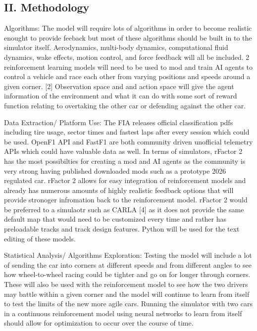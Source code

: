 \documentclass[11pt]{article} %
\begin{document}
\subsection{II. Methodology}

Algorithms: The model will require lots of algorithms in order to become realistic enought to provide feeback but most of these algorithms should be built in to the simulator itself. Aerodynamics, multi-body dynamics, computational fluid dynamics, wake effects, motion control, and force feedback will all be included. 2 reinforcement learning models will need to be used to mod and train AI agents to control a vehicle and race each other from varying positions and speeds around a given corner. [2] Observation space and and action space will give the agent information of the environment and what it can do with some sort of reward function relating to overtaking the other car or defending against the other car.

Data Extraction/ Platform Use: The FIA releases official classification pdfs including tire usage, sector times and fastest laps after every session which could be used. OpenF1 API and FastF1 are both community driven unofficial telemetry APIs which could have valuable data as well. In terms of simulators, rFactor 2 has the most possibilties for creating a mod and AI agents as the community is very strong having published downloaded mods such as a prototype 2026 regulated car. rFactor 2 allows for easy integration of reinforcement models and already has numerous amounts of highly realistic feedback options that will provide stronoger infromation back to the reinforcement model.  rFactor 2 would be preferred to a simulaotr such as CARLA [4] as it does not provide the same default map that would need to be customized every time and rather has preloadable tracks and track design features. Python will be used for the text editing of these models.

Statistical Analysis/ Algorithms Exploration: Testing the model will include a lot of sending the car into corners at different speeds and from different angles to see how wheel-to-wheel racing could be tighter and go on for longer through corners. These will also be used with the reinforcement model to see how the two drivers may battle within a given corner and the model will continue to learn from itself to test the limits of the new more agile cars. Running the simulator with two cars in a continuous reinforcement model using neural networks to learn from itself should allow for optimization to occur over the course of time. 
\end{document}
